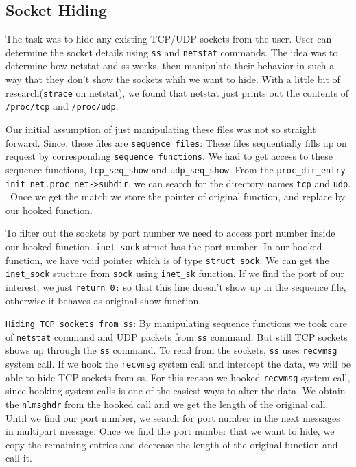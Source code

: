 \documentclass[10pt, letterpaper]{scrartcl}
\begin{document}
\subsection{Socket Hiding}
The task was to hide any existing TCP/UDP sockets from the user. 
User can determine the socket details using \texttt{ss} and \texttt{netstat} commands.
The idea was to determine how netstat and ss works, 
then manipulate their behavior in such a way that they don't show the sockets whih we want to hide. 
With a little bit of research(\texttt{strace} on netstat), 
we found that netstat just prints out the contents of \texttt{/proc/tcp} and \texttt{/proc/udp}.

Our initial assumption of just manipulating these files was not so straight forward. 
Since, these files are \texttt{sequence files}: 
These files sequentially fills up on request by corresponding \texttt{sequence functions}. 
We had to get access to these sequence functions, \texttt{tcp\_seq\_show} and \texttt{udp\_seq\_show}. 
From the \texttt{proc\_dir\_entry} \texttt{init\_net.proc\_net->subdir}, 
we can search for the directory names \texttt{tcp} and \texttt{udp}. \
Once we get the match we store the pointer of original function, and replace by our hooked function. 

To filter out the sockets by port number we need to access port number inside our hooked function. 
\texttt{inet\_sock} struct has the port number. 
In our hooked function, we have void pointer which is of type \texttt{struct sock}. 
We can get the \texttt{inet\_sock} stucture from \texttt{sock} using \texttt{inet\_sk} function. 
If we find the port of our interest, we just \texttt{return 0;} so that this line doesn't show up in the 
sequence file, otherwise it behaves as original show function. 

\texttt{Hiding TCP sockets from ss}: By manipulating sequence functions we took care of \texttt{netstat} 
command and UDP packets from \texttt{ss} command. But still TCP sockets shows up through the \texttt{ss} command.
To read from the sockets, \texttt{ss} uses \texttt{recvmsg} system call. 
If we hook the \texttt{recvmsg} system call and intercept the data, we will be able to hide TCP sockets from ss. 
For this reason we hooked \texttt{recvmsg} system call, 
since hooking system calls is one of the easiest ways to alter the data.
We obtain the \texttt{nlmsghdr} from the hooked call and we get the length of the original call.
Until we find our port number, we search for port number in the next messages in multipart message. 
Once we find the port number that we want to hide, 
we copy the remaining entries and decrease the length of the original function and call it.
\end{document}
